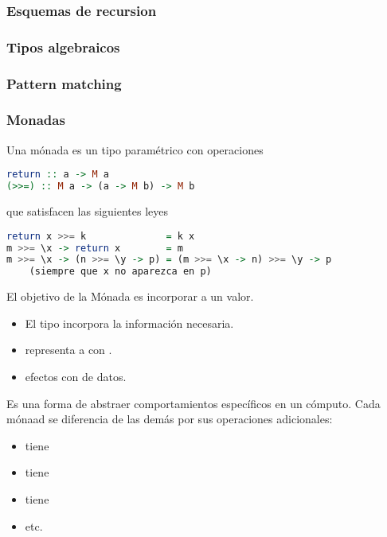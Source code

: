 \subsubsection{Esquemas de recursion}

\subsubsection{Tipos algebraicos}

\subsubsection{Pattern matching}

\subsubsection{Monadas}

Una mónada es un tipo paramétrico  con operaciones

\begin{lstlisting}[language=Haskell]
return :: a -> M a
(>>=) :: M a -> (a -> M b) -> M b
\end{lstlisting}

que satisfacen las siguientes leyes

\begin{lstlisting}[language=Haskell]
return x >>= k              = k x
m >>= \x -> return x        = m
m >>= \x -> (n >>= \y -> p) = (m >>= \x -> n) >>= \y -> p
    (siempre que x no aparezca en p)
\end{lstlisting}

El objetivo de la Mónada es incorporar  a un valor.
\begin{itemize}
  \item El tipo  incorpora la información necesaria.
  \item {} representa a  con .
  \item \xtt{($>>=$)}  efectos con  de datos.
\end{itemize}

Es una forma de abstraer comportamientos específicos en un cómputo. Cada mónaad se diferencia de las demás por sus operaciones adicionales:
\begin{itemize}
  \item {} tiene 
  \item {} tiene 
  \item {} tiene 
  \item etc.
\end{itemize}

